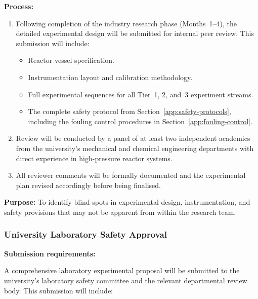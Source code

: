 \documentclass[12pt]{article}
\begin{document}
\noindent\textbf{Process:}
\begin{enumerate}[label=\arabic*., itemsep=4pt]
    \item Following completion of the industry research phase (Months~1--4), the
    detailed experimental design will be submitted for internal peer review. This
    submission will include:
    \begin{itemize}[itemsep=2pt]
        \item Reactor vessel specification.
        \item Instrumentation layout and calibration methodology.
        \item Full experimental sequences for all Tier~1, 2, and~3 experiment
              streams.
        \item The complete safety protocol from Section~\ref{app:safety-protocols}, including the fouling
              control procedures in Section~\ref{app:fouling-control}.
    \end{itemize}
    \item Review will be conducted by a panel of at least two independent academics
          from the university's mechanical and chemical engineering departments with
          direct experience in high-pressure reactor systems.
    \item All reviewer comments will be formally documented and the experimental plan
          revised accordingly before being finalised.
\end{enumerate}

\medskip
\noindent\textbf{Purpose:} To identify blind spots in experimental design,
instrumentation, and safety provisions that may not be apparent from within the
research team.

\subsubsection{University Laboratory Safety Approval}

\noindent\textbf{Submission requirements:}

\medskip
A comprehensive laboratory experimental proposal will be submitted to the
university's laboratory safety committee and the relevant departmental review body.
This submission will include:
\end{document}

